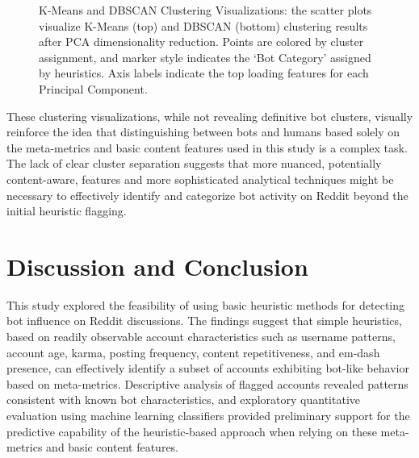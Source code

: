 \documentclass[
  12pt,
  letterpaper,
  DIV=11,
  numbers=noendperiod,
  abstract]{scrartcl}
\begin{document}
\begin{figure}


\caption{\label{fig-clust}K-Means and DBSCAN Clustering Visualizations:
the scatter plots visualize K-Means (top) and DBSCAN (bottom) clustering
results after PCA dimensionality reduction. Points are colored by
cluster assignment, and marker style indicates the `Bot Category'
assigned by heuristics. Axis labels indicate the top loading features
for each Principal Component.}

\end{figure}%

These clustering visualizations, while not revealing definitive bot
clusters, visually reinforce the idea that distinguishing between bots
and humans based solely on the meta-metrics and basic content features
used in this study is a complex task. The lack of clear cluster
separation suggests that more nuanced, potentially content-aware,
features and more sophisticated analytical techniques might be necessary
to effectively identify and categorize bot activity on Reddit beyond the
initial heuristic flagging.

\section{Discussion and Conclusion}\label{discussion-and-conclusion}

This study explored the feasibility of using basic heuristic methods for
detecting bot influence on Reddit discussions. The findings suggest that
simple heuristics, based on readily observable account characteristics
such as username patterns, account age, karma, posting frequency,
content repetitiveness, and em-dash presence, can effectively identify a
subset of accounts exhibiting bot-like behavior based on meta-metrics.
Descriptive analysis of flagged accounts revealed patterns consistent
with known bot characteristics, and exploratory quantitative evaluation
using machine learning classifiers provided preliminary support for the
predictive capability of the heuristic-based approach when relying on
these meta-metrics and basic content features.
\end{document}
